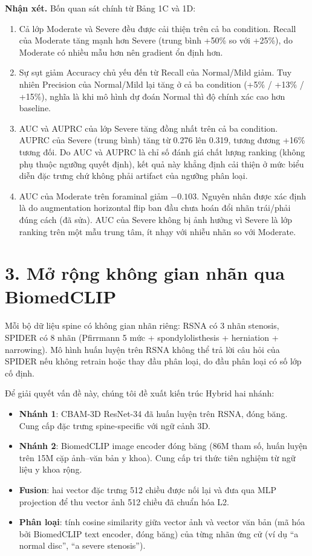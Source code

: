 \documentclass[11pt,a4paper]{article}
\begin{document}
\vspace{0.5em}
\noindent\textbf{Nhận xét.}
Bốn quan sát chính từ Bảng 1C và 1D:
\begin{enumerate}
\itemsep 1pt
\item Cả lớp Moderate và Severe đều được cải thiện trên cả ba condition. Recall của Moderate tăng mạnh hơn Severe (trung bình +50\% so với +25\%), do Moderate có nhiều mẫu hơn nên gradient ổn định hơn.
\item Sự sụt giảm Accuracy chủ yếu đến từ Recall của Normal/Mild giảm. Tuy nhiên Precision của Normal/Mild lại tăng ở cả ba condition (+5\% / +13\% / +15\%), nghĩa là khi mô hình dự đoán Normal thì độ chính xác cao hơn baseline.
\item AUC và AUPRC của lớp Severe tăng đồng nhất trên cả ba condition. AUPRC của Severe (trung bình) tăng từ 0.276 lên 0.319, tương đương +16\% tương đối. Do AUC và AUPRC là chỉ số đánh giá chất lượng ranking (không phụ thuộc ngưỡng quyết định), kết quả này khẳng định cải thiện ở mức biểu diễn đặc trưng chứ không phải artifact của ngưỡng phân loại.
\item AUC của Moderate trên foraminal giảm $-0.103$. Nguyên nhân được xác định là do augmentation horizontal flip ban đầu chưa hoán đổi nhãn trái/phải đúng cách (đã sửa). AUC của Severe không bị ảnh hưởng vì Severe là lớp ranking trên một mẫu trung tâm, ít nhạy với nhiễu nhãn so với Moderate.
\end{enumerate}

\section*{3. Mở rộng không gian nhãn qua BiomedCLIP}

\noindent Mỗi bộ dữ liệu spine có không gian nhãn riêng: RSNA có 3 nhãn stenosis, SPIDER có 8 nhãn (Pfirrmann 5 mức + spondylolisthesis + herniation + narrowing). Mô hình huấn luyện trên RSNA không thể trả lời câu hỏi của SPIDER nếu không retrain hoặc thay đầu phân loại, do đầu phân loại có số lớp cố định.

\noindent Để giải quyết vấn đề này, chúng tôi đề xuất kiến trúc Hybrid hai nhánh:
\begin{itemize}
\itemsep 1pt
\item \textbf{Nhánh 1}: CBAM-3D ResNet-34 đã huấn luyện trên RSNA, đóng băng. Cung cấp đặc trưng spine-specific với ngữ cảnh 3D.
\item \textbf{Nhánh 2}: BiomedCLIP image encoder đóng băng (86M tham số, huấn luyện trên 15M cặp ảnh--văn bản y khoa). Cung cấp tri thức tiên nghiệm từ ngữ liệu y khoa rộng.
\item \textbf{Fusion}: hai vector đặc trưng 512 chiều được nối lại và đưa qua MLP projection để thu vector ảnh 512 chiều đã chuẩn hóa L2.
\item \textbf{Phân loại}: tính cosine similarity giữa vector ảnh và vector văn bản (mã hóa bởi BiomedCLIP text encoder, đóng băng) của từng nhãn ứng cử (ví dụ ``a normal disc'', ``a severe stenosis'').
\end{itemize}
\end{document}
